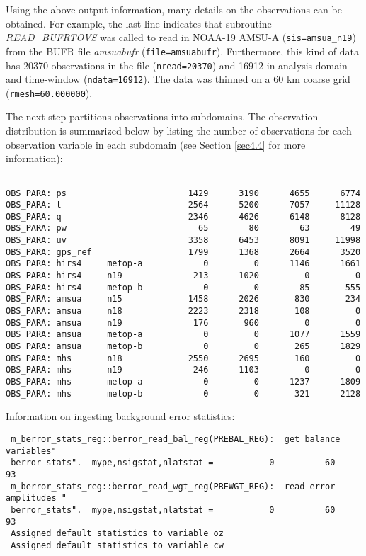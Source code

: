 Using the above output information, many details on the observations can be obtained. For example, the last line indicates that subroutine \textit{READ\_BUFRTOVS} was called to read in NOAA-19 AMSU-A (\verb|sis=amsua_n19|) from the BUFR file \textit{amsuabufr} (\verb|file=amsuabufr|). Furthermore, this kind of data has 20370 observations in the file (\verb|nread=20370|) and 16912 in analysis domain and time-window (\verb|ndata=16912|). The data was thinned on a 60 km coarse grid (\verb|rmesh=60.000000|).


The next step partitions observations into subdomains. The observation distribution is summarized below by listing the number of observations for each observation variable in each subdomain (see Section \ref{sec4.4} for more information):

\begin{scriptsize}
\begin{verbatim}

OBS_PARA: ps                        1429      3190      4655      6774
OBS_PARA: t                         2564      5200      7057     11128
OBS_PARA: q                         2346      4626      6148      8128
OBS_PARA: pw                          65        80        63        49
OBS_PARA: uv                        3358      6453      8091     11998
OBS_PARA: gps_ref                   1799      1368      2664      3520
OBS_PARA: hirs4     metop-a            0         0      1146      1661
OBS_PARA: hirs4     n19              213      1020         0         0
OBS_PARA: hirs4     metop-b            0         0        85       555
OBS_PARA: amsua     n15             1458      2026       830       234
OBS_PARA: amsua     n18             2223      2318       108         0
OBS_PARA: amsua     n19              176       960         0         0
OBS_PARA: amsua     metop-a            0         0      1077      1559
OBS_PARA: amsua     metop-b            0         0       265      1829
OBS_PARA: mhs       n18             2550      2695       160         0
OBS_PARA: mhs       n19              246      1103         0         0
OBS_PARA: mhs       metop-a            0         0      1237      1809
OBS_PARA: mhs       metop-b            0         0       321      2128

\end{verbatim}
\end{scriptsize}
Information on ingesting background error statistics:
\begin{scriptsize}
\begin{verbatim}
 m_berror_stats_reg::berror_read_bal_reg(PREBAL_REG):  get balance variables"
 berror_stats".  mype,nsigstat,nlatstat =           0          60          93
 m_berror_stats_reg::berror_read_wgt_reg(PREWGT_REG):  read error amplitudes "
 berror_stats".  mype,nsigstat,nlatstat =           0          60          93
 Assigned default statistics to variable oz
 Assigned default statistics to variable cw
\end{verbatim}
\end{scriptsize}

